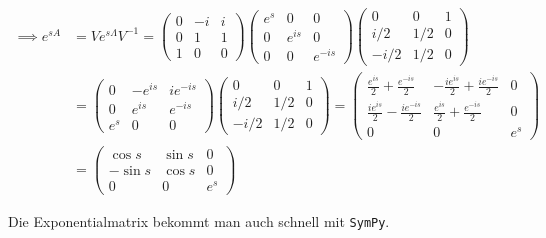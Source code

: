 \begin{solution}
\begin{align*}
    \implies
    e^{sA}
    & =
    V e^{s \Lambda} V^{-1}
    =
    \begin{pmatrix}
        0 & -i & i \\
        0 &  1 & 1 \\
        1 &  0 & 0
    \end{pmatrix}
    \begin{pmatrix}
        e^s & 0      & 0 \\
        0   & e^{is} & 0 \\
        0   & 0      & e^{-is}
    \end{pmatrix}
    \begin{pmatrix}
        0   & 0   & 1 \\
        i/2 & 1/2 & 0 \\
       -i/2 & 1/2 & 0
    \end{pmatrix} \\
    & =
    \begin{pmatrix}
        0   & -e^{is} & ie^{-is} \\
        0   & e^{is}  & e^{-is} \\
        e^s & 0       & 0
    \end{pmatrix}
    \begin{pmatrix}
         0   & 0   & 1 \\
         i/2 & 1/2 & 0 \\
        -i/2 & 1/2 & 0
    \end{pmatrix}
    =
    \begin{pmatrix}
        \frac{e^{is}}{2}  + \frac{e^{-is}}{2}  & -\frac{ie^{is}}{2} + \frac{ie^{-is}}{2} & 0 \\
        \frac{ie^{is}}{2} - \frac{ie^{-is}}{2} &  \frac{e^{is}}{2} + \frac{e^{-is}}{2}   & 0 \\
        0                                      &  0                                      & e^s
    \end{pmatrix} \\
    & =
    \begin{pmatrix}
         \cos{s} & \sin{s} & 0 \\
        -\sin{s} & \cos{s} & 0 \\
         0       & 0       & e^s
    \end{pmatrix}
\end{align*}

Die Exponentialmatrix bekommt man auch schnell mit \verb|SymPy|.

\begin{lstlisting}[language = Python]


\end{lstlisting}
\end{solution}
